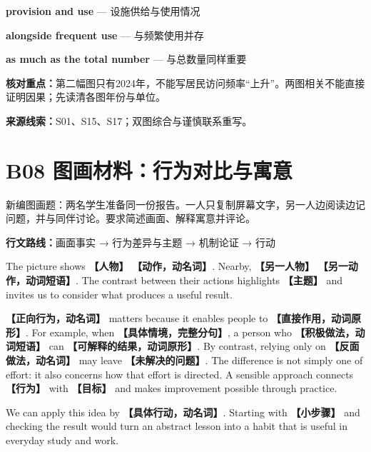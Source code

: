 \documentclass[11pt,a4paper,fontset=macnew]{ctexart}
\newenvironment{writing}{\begingroup\fontsize{10.5}{13.5}\selectfont\setlength{\parskip}{3pt}}{\par\endgroup}
\begin{document}
\par\vspace{4pt}{\bfseries 好词好句：优先记这三处}\par\nopagebreak
{\small\textbf{provision and use} — 设施供给与使用情况}\par
{\small\textbf{alongside frequent use} — 与频繁使用并存}\par
{\small\textbf{as much as the total number} — 与总数量同样重要}\par
{\small\textbf{核对重点：}第二幅图只有2024年，不能写居民访问频率“上升”。两图相关不能直接证明因果；先读清各图年份与单位。}\par
{\fontsize{8}{10}\selectfont\textbf{来源线索：}S01、S15、S17；双图综合与谨慎联系重写。}\par
\clearpage\section*{B08  图画材料：行为对比与寓意}
{\small 新编图画题：两名学生准备同一份报告。一人只复制屏幕文字，另一人边阅读边记问题，并与同伴讨论。要求简述画面、解释寓意并评论。}\par
{\small\textbf{行文路线：}画面事实 → 行为差异与主题 → 机制论证 → 行动}\par
\par\vspace{4pt}{\bfseries 可替换模板}\par\nopagebreak
\begin{writing}
The picture shows {\bfseries 【人物】} {\bfseries 【动作，动名词】}. Nearby, {\bfseries 【另一人物】} {\bfseries 【另一动作，动词短语】}. The contrast between their actions highlights {\bfseries 【主题】} and invites us to consider what produces a useful result.

{\bfseries 【正向行为，动名词】} matters because it enables people to {\bfseries 【直接作用，动词原形】}. For example, when {\bfseries 【具体情境，完整分句】}, a person who {\bfseries 【积极做法，动词短语】} can {\bfseries 【可解释的结果，动词原形】}. By contrast, relying only on {\bfseries 【反面做法，动名词】} may leave {\bfseries 【未解决的问题】}. The difference is not simply one of effort: it also concerns how that effort is directed. A sensible approach connects {\bfseries 【行为】} with {\bfseries 【目标】} and makes improvement possible through practice.

We can apply this idea by {\bfseries 【具体行动，动名词】}. Starting with {\bfseries 【小步骤】} and checking the result would turn an abstract lesson into a habit that is useful in everyday study and work.

\end{writing}
\end{document}
